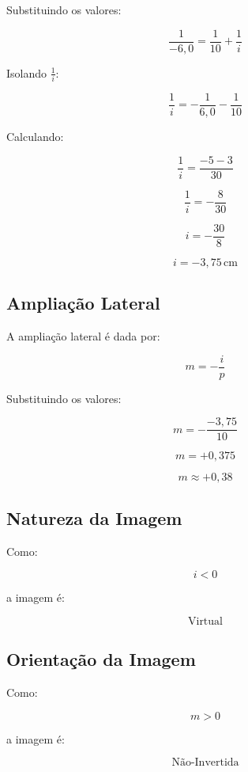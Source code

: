 \documentclass[12pt,a4paper]{article}
\begin{document}
Substituindo os valores:

\[
\frac{1}{-6,0}
=
\frac{1}{10}
+
\frac{1}{i}
\]

Isolando $\frac{1}{i}$:

\[
\frac{1}{i}
=
-\frac{1}{6,0}
-
\frac{1}{10}
\]

Calculando:

\[
\frac{1}{i}
=
\frac{-5 - 3}{30}
\]

\[
\frac{1}{i}
=
-\frac{8}{30}
\]

\[
i
=
-\frac{30}{8}
\]

\[
i = -3,75\,\text{cm}
\]


\subsection*{Ampliação Lateral}

A ampliação lateral é dada por:

\[
m = -\frac{i}{p}
\]

Substituindo os valores:

\[
m
=
-\frac{-3,75}{10}
\]

\[
m = +0,375
\]

\[
m \approx +0,38
\]


\subsection*{Natureza da Imagem}

Como:

\[
i < 0
\]

a imagem é:

\[
\boxed{\text{Virtual}}
\]


\subsection*{Orientação da Imagem}

Como:

\[
m > 0
\]

a imagem é:

\[
\boxed{\text{Não-Invertida}}
\]

\end{document}
